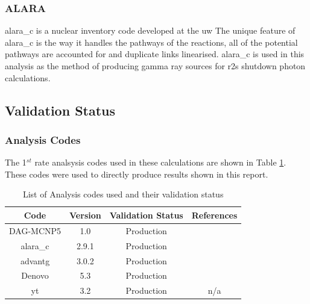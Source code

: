 \documentclass[12pt]{article}
\begin{document}
\subsubsection{ALARA}
\gls{alara_c} \cite{alara} is a nuclear inventory code developed at the \gls{uw}
The unique feature of \gls{alara_c} is the way it handles the
pathways of the reactions, all of the potential pathways are accounted for and
duplicate links linearised. \gls{alara_c} is used in this analysis as the method
of producing gamma ray sources for \gls{r2s} shutdown photon calculations.

\subsection{Validation Status}
\subsubsection*{Analysis Codes}
The 1$^{st}$ rate analsysis codes used in these calculations are shown in Table 
\ref{table:validation}. These codes were used to directly produce results shown
in this report.
\begin{centering}
 \begin{table}[ht!]
  \begin{tabular}{c | c | c | c}
  \hline
  Code & Version & Validation Status & References \\
  \hline 
  DAG-MCNP5 & 1.0 & Production & \cite{dagmc_validation}\\
  \gls{alara_c} & 2.9.1 & Production & \cite{alara}\\
  \gls{advantg} & 3.0.2 & Production & \cite{advantg}\\
  Denovo & 5.3 & Production & \cite{denovo} \\
  yt & 3.2 & Production & n/a \\
  \end{tabular}
 \caption{List of Analysis codes used and their validation status}
 \label{table:validation}
 \end{table}
\end{centering}

\end{document}
